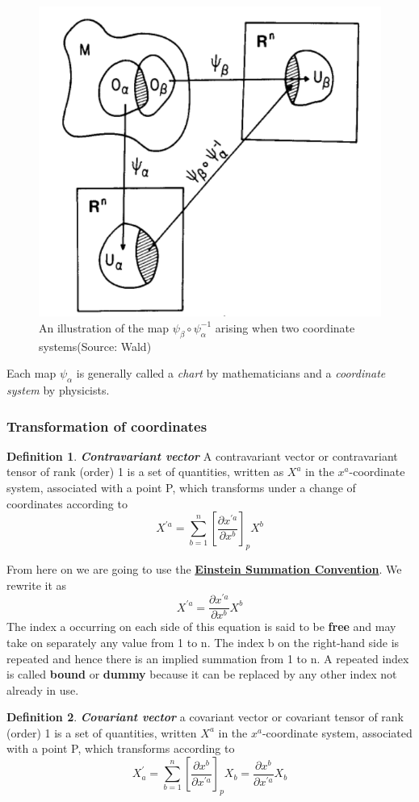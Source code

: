 \documentclass[12pt,a4paper]{article}
\numberwithin{table}{section}
\numberwithin{figure}{section}
\numberwithin{equation}{section}
\theoremstyle{remark}
\theoremstyle{definition}
\newtheorem{definition}{Definition}[section]
\begin{document}
\begin{figure}[H]
    \centering
  \includegraphics[scale=0.6]{manifold}
  \caption{An illustration of the map $\psi_\beta\circ\psi_\alpha^{-1}$ arising when two coordinate systems(Source: Wald\cite{wald})}
  \label{fig:manifold}
\end{figure}
Each map $\psi_\alpha$ is generally called a \textit{chart} by mathematicians and a \textit{coordinate system} by physicists.

\subsubsection*{Transformation of coordinates}
\begin{definition}{\textbf{\textit{Contravariant vector}}}
A contravariant vector or contravariant tensor of rank (order) 1 is a set of 
quantities, written as $X^a$ in the $x^a$-coordinate system, associated with a point P, which transforms under a change of coordinates according to 
$$X^{'a} =\sum_{b=1}^n \left[\dfrac{\partial x^{'a}}{\partial x^b}\right]_pX^b$$
\end{definition}
From here on we are going to use the \href{https://en.wikipedia.org/wiki/Einstein_notation}{\textbf{Einstein Summation Convention}}. We rewrite it as
$$X^{'a} =\dfrac{\partial x^{'a}}{\partial x^b} X^b $$
The index a occurring on each side of this equation is said to be \textbf{free} and may 
take on separately any value from 1 to n. The index b on the right-hand side is 
repeated and hence there is an implied summation from 1 to n. A repeated 
index is called \textbf{bound} or \textbf{dummy} because it can be replaced by any other index not already in use.
\begin{definition}{\textbf{\textit{Covariant vector}}}
a covariant vector or covariant tensor of rank (order) 1 is a set of quantities, written $X^a$ in the $x^a$-coordinate system, associated with a point P, which transforms according to 
$$X^{'}_a =\sum_{b=1}^n\left[\dfrac{\partial x^{b}}{\partial x^{'a}}\right]_p X_b=\dfrac{\partial x^{b}}{\partial x^{'a}} X_b $$
\end{definition}
\end{document}
